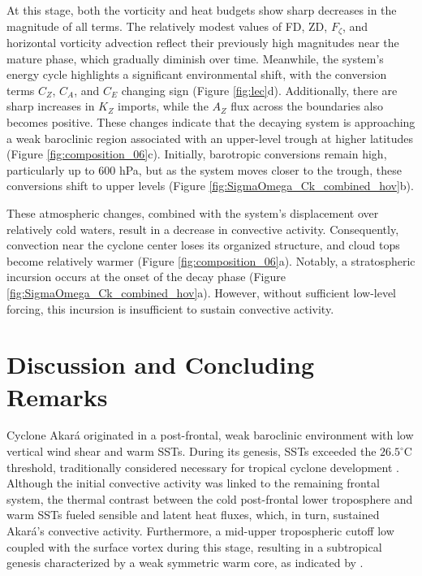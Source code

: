 \documentclass[pdflatex,sn-chicago]{sn-jnl}%
\theoremstyle{plain}
\theoremstyle{definition}
\theoremstyle{remark}
\theoremstyle{definition}
\begin{document}
At this stage, both the vorticity and heat budgets show sharp decreases in the magnitude of all terms. The relatively modest values of FD, ZD, $F_{\zeta}$, and horizontal vorticity advection reflect their previously high magnitudes near the mature phase, which gradually diminish over time. Meanwhile, the system's energy cycle highlights a significant environmental shift, with the conversion terms $C_Z$, $C_A$, and $C_E$ changing sign (Figure \ref{fig:lec}d). Additionally, there are sharp increases in $K_Z$ imports, while the $A_Z$ flux across the boundaries also becomes positive. These changes indicate that the decaying system is approaching a weak baroclinic region associated with an upper-level trough at higher latitudes (Figure \ref{fig:composition_06}c). Initially, barotropic conversions remain high, particularly up to 600 hPa, but as the system moves closer to the trough, these conversions shift to upper levels (Figure \ref{fig:SigmaOmega_Ck_combined_hov}b).

These atmospheric changes, combined with the system's displacement over relatively cold waters, result in a decrease in convective activity. Consequently, convection near the cyclone center loses its organized structure, and cloud tops become relatively warmer (Figure \ref{fig:composition_06}a). Notably, a stratospheric incursion occurs at the onset of the decay phase (Figure \ref{fig:SigmaOmega_Ck_combined_hov}a). However, without sufficient low-level forcing, this incursion is insufficient to sustain convective activity.


\section{Discussion and Concluding Remarks}


Cyclone Akará originated in a post-frontal, weak baroclinic environment with low vertical wind shear and warm SSTs. During its genesis, SSTs exceeded the $26.5^{\circ}\text{C}$ threshold, traditionally considered necessary for tropical cyclone development \citep{gray1968global,emanuel1986air}. Although the initial convective activity was linked to the remaining frontal system, the thermal contrast between the cold post-frontal lower troposphere and warm SSTs fueled sensible and latent heat fluxes, which, in turn, sustained Akará's convective activity. Furthermore, a mid-upper tropospheric cutoff low coupled with the surface vortex during this stage, resulting in a subtropical genesis characterized by a weak symmetric warm core, as indicated by \citet{reboita2024assessment}.
\end{document}

